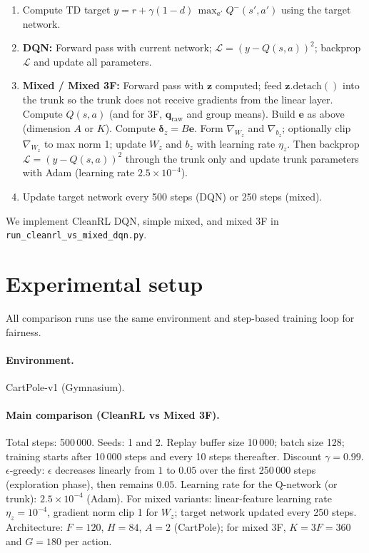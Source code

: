 \documentclass[11pt]{article}
\begin{document}
\begin{enumerate}
\setlength{\itemsep}{2pt}
\item Compute TD target $y = r + \gamma(1-d)\,\max_{a'} Q^-(s',a')$ using the target network.
\item \textbf{DQN:} Forward pass with current network; $\mathcal{L} = (y - Q(s,a))^2$; backprop $\mathcal{L}$ and update all parameters.
\item \textbf{Mixed / Mixed 3F:} Forward pass with $\mathbf{z}$ computed; feed $\mathbf{z}.\mathrm{detach}()$ into the trunk so the trunk does not receive gradients from the linear layer. Compute $Q(s,a)$ (and for 3F, $\mathbf{q}_{\mathrm{raw}}$ and group means). Build $\mathbf{e}$ as above (dimension $A$ or $K$). Compute $\boldsymbol{\delta}_z = B\mathbf{e}$. Form $\nabla_{W_z}$ and $\nabla_{b_z}$; optionally clip $\nabla_{W_z}$ to max norm 1; update $W_z$ and $b_z$ with learning rate $\eta_z$. Then backprop $\mathcal{L} = (y - Q(s,a))^2$ through the trunk only and update trunk parameters with Adam (learning rate $2.5\times 10^{-4}$).
\item Update target network every 500 steps (DQN) or 250 steps (mixed).
\end{enumerate}

We implement CleanRL DQN, simple mixed, and mixed 3F in \texttt{run\_cleanrl\_vs\_mixed\_dqn.py}.

\section{Experimental setup}

All comparison runs use the same environment and step-based training loop for fairness.

\paragraph{Environment.} CartPole-v1 (Gymnasium).

\paragraph{Main comparison (CleanRL vs Mixed 3F).} Total steps: 500\,000. Seeds: 1 and 2. Replay buffer size 10\,000; batch size 128; training starts after 10\,000 steps and every 10 steps thereafter. Discount $\gamma = 0.99$. $\epsilon$-greedy: $\epsilon$ decreases linearly from $1$ to $0.05$ over the first 250\,000 steps (exploration phase), then remains $0.05$. Learning rate for the Q-network (or trunk): $2.5\times 10^{-4}$ (Adam). For mixed variants: linear-feature learning rate $\eta_z = 10^{-4}$, gradient norm clip 1 for $W_z$; target network updated every 250 steps. Architecture: $F=120$, $H=84$, $A=2$ (CartPole); for mixed 3F, $K = 3F = 360$ and $G = 180$ per action.
\end{document}
